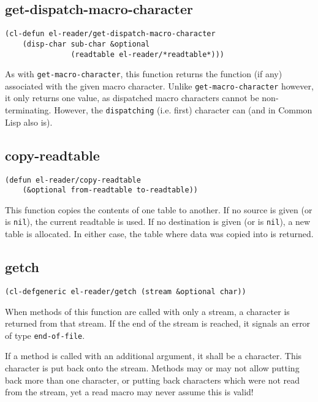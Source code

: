 \documentclass[a4paper,10pt,twoside]{report}
\newcommand{\cl}{Common Lisp}
\newcommand{\sym}[1]{\texttt{#1}}
\newcommand{\fun}[1]{\texttt{#1}}
\newcommand{\nil}{\sym{nil}}
\begin{document}
\subsection{get-dispatch-macro-character}
\label{subsec:get-dispatch-macro-character}

\begin{lstlisting}[style=lispinline]
(cl-defun el-reader/get-dispatch-macro-character
    (disp-char sub-char &optional
               (readtable el-reader/*readtable*)))
\end{lstlisting}

As with \fun{get-macro-character}, this function returns the function (if any)
associated with the given macro character.  Unlike \fun{get-macro-character}
however, it only returns one value, as dispatched macro characters cannot be
non-terminating.  However, the \texttt{dispatching} (i.e. first) character can
(and in \cl{} also is).

\subsection{copy-readtable}
\label{subsec:copy-readtable}

\begin{lstlisting}[style=lispinline]
(defun el-reader/copy-readtable
    (&optional from-readtable to-readtable))
\end{lstlisting}

This function copies the contents of one table to another.  If no source is
given (or is \nil{}), the current readtable is used.  If no destination is given
(or is \nil{}), a new table is allocated.  In either case, the table where data
was copied into is returned.

\subsection{getch}
\label{subsec:getch}

\begin{lstlisting}[style=lispinline]
(cl-defgeneric el-reader/getch (stream &optional char))
\end{lstlisting}

When methods of this function are called with only a stream, a character is
returned from that stream.  If the end of the stream is reached, it signals an
error of type \sym{end-of-file}.

If a method is called with an additional argument, it shall be a character.
This character is put back onto the stream.  Methods may or may not allow
putting back more than one character, or putting back characters which were not
read from the stream, yet a read macro may never assume this is valid!
\end{document}
